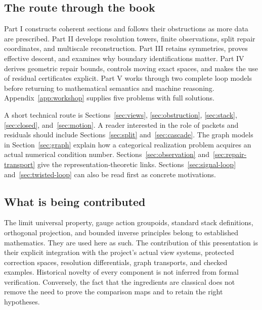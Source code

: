 \documentclass[11pt]{article}
\begin{document}
\subsection*{The route through the book}
Part I constructs coherent sections and follows their obstructions as more data are prescribed. Part II develops resolution towers, finite observations, split repair coordinates, and multiscale reconstruction. Part III retains symmetries, proves effective descent, and examines why boundary identifications matter. Part IV derives geometric repair bounds, controls moving exact spaces, and makes the use of residual certificates explicit. Part V works through two complete loop models before returning to mathematical semantics and machine reasoning. Appendix~\ref{app:workshop} supplies five problems with full solutions.

A short technical route is Sections~\ref{sec:views}, \ref{sec:obstruction}, \ref{sec:stack}, \ref{sec:closed}, and~\ref{sec:motion}. A reader interested in the role of packets and residuals should include Sections~\ref{sec:split} and~\ref{sec:cascade}. The graph models in Section~\ref{sec:graph} explain how a categorical realization problem acquires an actual numerical condition number. Sections~\ref{sec:observation} and~\ref{sec:repair-transport} give the representation-theoretic links. Sections~\ref{sec:signal-loop} and~\ref{sec:twisted-loop} can also be read first as concrete motivations.

\subsection*{What is being contributed}
The limit universal property, gauge action groupoids, standard stack definitions, orthogonal projection, and bounded inverse principles belong to established mathematics. They are used here as such. The contribution of this presentation is their explicit integration with the project's actual view systems, protected correction spaces, resolution differentials, graph transports, and checked examples. Historical novelty of every component is not inferred from formal verification. Conversely, the fact that the ingredients are classical does not remove the need to prove the comparison maps and to retain the right hypotheses.

\clearpage\begingroup\setlength{\parskip}{0pt}\tableofcontents\endgroup
\clearpage{}










\appendix



\end{document}
